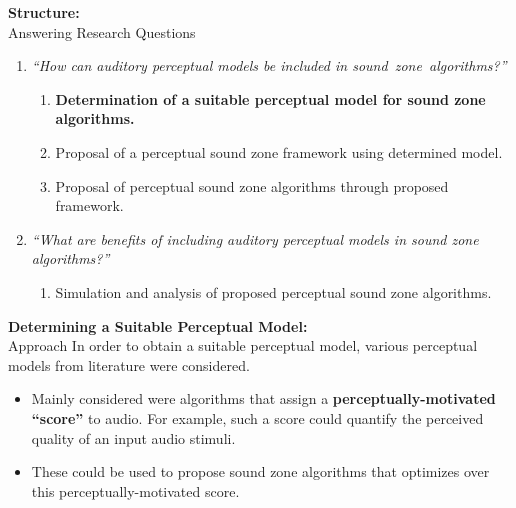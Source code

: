 \documentclass[aspectratio=169]{beamer}
\begin{document}
\begin{frame}{\textbf{Structure:}\\ Answering Research Questions}
    \begin{enumerate}
        \item {\textit{``How can auditory perceptual models be included in sound~zone~algorithms?''}}
            \vspace{7pt}
            \begin{enumerate}
                \item \textbf{Determination of a suitable perceptual model for sound zone algorithms.}
                \vspace{7pt}
                \item Proposal of a perceptual sound zone framework using determined model. 
                \vspace{7pt}
                \item Proposal of perceptual sound zone algorithms through proposed framework.
                \vspace{7pt}
            \end{enumerate}
        \item {\textit{``What are benefits of including auditory perceptual models in sound zone algorithms?''}}
            \vspace{-5pt}
            \begin{enumerate}
                \item Simulation and analysis of proposed perceptual sound zone algorithms.
            \end{enumerate}
    \end{enumerate}
\end{frame}

\begin{frame}{\textbf{Determining a Suitable Perceptual Model:}\\ Approach}
    In order to obtain a suitable perceptual model, various perceptual models from literature 
    were considered.\\
    \vspace{10pt}
    \begin{itemize}
        \item Mainly considered were algorithms that assign a \textbf{perceptually-motivated ``score''} to audio.
            For example, such a score could quantify the perceived quality of an input audio stimuli.
        \item These could be used to propose sound zone algorithms that optimizes over this perceptually-motivated score.
    \end{itemize}
\end{frame}
\end{document}
